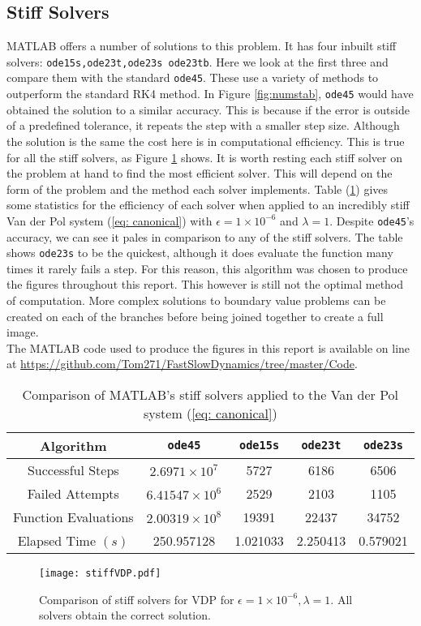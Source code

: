 \subsection{Stiff Solvers}
MATLAB offers a number of solutions to this problem. It has four inbuilt stiff solvers: \texttt{ode15s,ode23t,ode23s ode23tb}. Here we look at the first three and compare them with the standard \texttt{ode45}. These use a variety of methods to outperform the standard RK4 method. In Figure \ref{fig:numstab}, \texttt{ode45} would have obtained the solution to a similar accuracy. This is because if the error is outside of a predefined tolerance, it repeats the step with a smaller step size. Although the solution is the same the cost here is in computational efficiency. This is true for all the stiff solvers, as Figure \ref{fig:stiffts} shows. It is worth resting each stiff solver on the problem at hand to find the most efficient solver. This will depend on the form of the problem and the method each solver implements. Table (\ref{tab:stiffcomparison}) gives some statistics for the efficiency of each solver when applied to an incredibly stiff Van der Pol system (\ref{eq: canonical}) with $\epsilon=1\times10^{-6}$ and $\lambda=1$. Despite \texttt{ode45}'s accuracy, we can see it pales in comparison to any of the stiff solvers. The table shows \texttt{ode23s} to be the quickest, although it does evaluate the function many times it rarely fails a step. For this reason, this algorithm was chosen to produce the figures throughout this report. This however is still not the optimal method of computation. More complex  solutions to boundary value problems can be created on each of the branches before being joined together to create a full image.\\



The MATLAB code used to produce the figures in this report is available on line at \url{https://github.com/Tom271/FastSlowDynamics/tree/master/Code}.

\begin{table}
	\centering
	\begin{tabular}{|c|c|c|c|c|}
		\hline 
		\textbf{Algorithm} & \texttt{ode45} & \texttt{ode15s} & \texttt{ode23t} & \texttt{ode23s} \\ 
		\hline 
		Successful Steps & $2.6971\times 10^7$ & 5727 & 6186 & 6506 \\ 
		\hline 
		Failed Attempts & $6.41547\times 10^6$ & 2529 & 2103 & 1105 \\ 
		\hline 
		Function Evaluations & $2.00319\times 10^8$ & 19391 & 22437 & 34752 \\ 
		\hline 
		Elapsed Time $(s)$ & 250.957128 & 1.021033 & 2.250413 & 0.579021 \\ 
		\hline 
	\end{tabular} 
\caption{Comparison of MATLAB's stiff solvers applied to the Van der Pol system (\ref{eq: canonical})}
\label{tab:stiffcomparison}
\end{table}

\begin{figure}
	\centering
	\texttt{[image: stiffVDP.pdf]}
	\caption[Stiff Solvers]{Comparison of stiff solvers for VDP for $\epsilon=1\times 10^{-6}, \lambda=1$. All solvers obtain the correct solution.}
	\label{fig:stiffts}
\end{figure}
